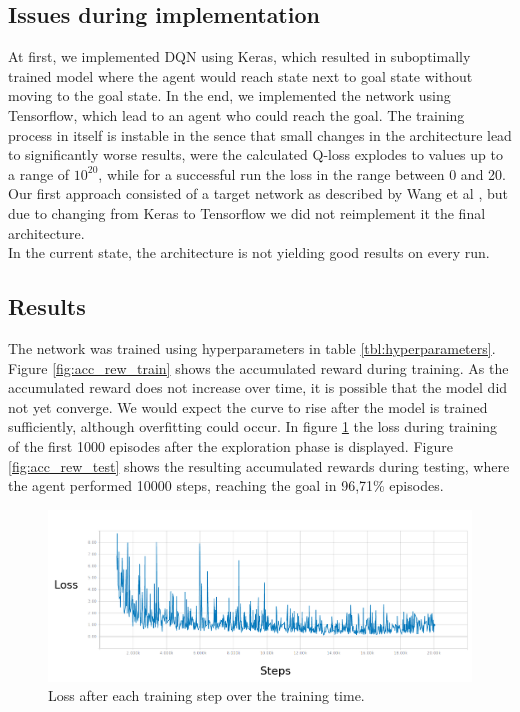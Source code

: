 \documentclass[a4paper, 11pt]{article}
\begin{document}
\subsection{Issues during implementation}
At first, we implemented DQN using Keras, which resulted in suboptimally trained model where the agent would reach state next to goal state without moving to the goal state. In the end, we implemented the network using Tensorflow, which lead to an agent who could reach the goal. The training process in itself is instable in the sence that small changes in the architecture lead to significantly worse results, were the calculated Q-loss explodes to values up to a range of $10^{20}$, while for a successful run the loss in the range between 0 and 20.  \\
Our first approach consisted of a target network as described by Wang et al \cite{Wang15}, but due to changing from Keras to Tensorflow we did not reimplement it the final architecture.\\
In the current state, the architecture is not yielding good results on every run.

\subsection*{Results}
The network was trained using hyperparameters in table \ref{tbl:hyperparameters}. 
Figure \ref{fig:acc_rew_train} shows the accumulated reward during training. As the accumulated reward does not increase over time, it is possible that the model did not yet converge. We would expect the curve to rise after the model is trained sufficiently, although overfitting could occur. In figure \ref{fig:train_loss} the loss during training of the first 1000 episodes after the exploration phase is displayed. Figure \ref{fig:acc_rew_test} shows the resulting accumulated rewards during testing, where the agent performed 10000 steps, reaching the goal in 96,71\% episodes.


\begin{figure}[ht!]
    \centering
    \includegraphics[width=16cm]{images/loss.png}
        \caption{Loss after each training step over the training time.}
        \label{fig:train_loss}
\end{figure}
\end{document}
